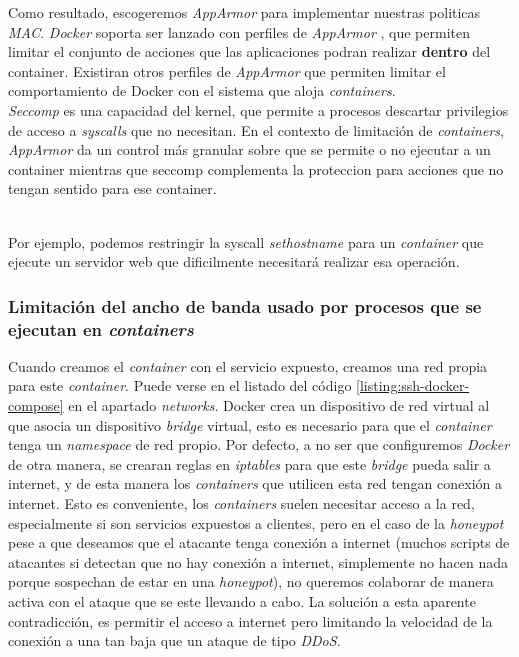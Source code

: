 Como resultado, escogeremos \emph{AppArmor} \cite{wiki-apparmor} para implementar nuestras politicas \emph{MAC}. \emph{Docker} soporta ser lanzado con perfiles de \emph{AppArmor} \cite{docker-doc-apparmor}, que permiten
limitar el conjunto de acciones que las aplicaciones podran realizar \textbf{dentro} del container. Existiran otros perfiles de \emph{AppArmor} que permiten limitar el comportamiento
de Docker con el sistema que aloja \emph{containers}.
\ \\
\emph{Seccomp} \cite{wiki-seccomp} es una capacidad del kernel, que permite a procesos descartar privilegios de acceso a \emph{syscalls} 
que no necesitan. En el contexto de limitación de \emph{containers}, \emph{AppArmor} da un control más granular sobre que se permite 
o no ejecutar a un container mientras que seccomp complementa 
la proteccion para acciones que no tengan sentido para ese container.

\ \\
Por ejemplo, podemos restringir la syscall \emph{sethostname} para un \emph{container} 
que ejecute un servidor web que dificilmente necesitará realizar esa operación.

\subsubsection{Limitación del ancho de banda usado por procesos que se ejecutan en \emph{containers}}

Cuando creamos el \emph{container} con el servicio expuesto, creamos una red propia para este \emph{container}. Puede verse
en el listado del código \ref{listing:ssh-docker-compose} en el apartado \emph{networks}.
Docker crea un dispositivo de red virtual al que asocia un dispositivo \emph{bridge} virtual, esto es necesario para que el 
\emph{container} tenga un \emph{namespace} \cite{wiki-namespaces} de red propio. Por defecto, a no ser que configuremos \emph{Docker}
de otra manera, se crearan reglas en \emph{iptables} para que este \emph{bridge} pueda salir a internet, y de esta manera los 
\emph{containers} que utilicen esta red tengan conexión a internet.
Esto es conveniente, los \emph{containers} suelen necesitar acceso a la red, especialmente si son servicios expuestos a clientes, pero en el caso de la \emph{honeypot} pese a que deseamos que el atacante tenga
conexión a internet (muchos scripts de atacantes si detectan que no hay conexión a internet, simplemente no hacen nada porque sospechan 
de estar en una \emph{honeypot}), no queremos colaborar de manera activa con el ataque que se este llevando a cabo.
La solución a esta aparente contradicción, es permitir el acceso a internet pero limitando la velocidad de la conexión a una tan baja que un ataque
de tipo \emph{DDoS}.

